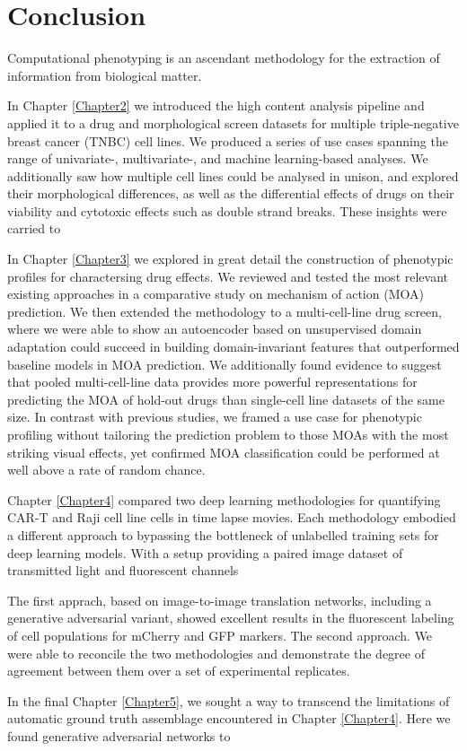 
\chapter{Conclusion} %

\label{Chapter6} %

Computational phenotyping is an ascendant methodology for the extraction of information from biological matter.

In Chapter \ref{Chapter2} we introduced the high content analysis pipeline and applied it to a drug and morphological screen datasets for multiple triple-negative breast cancer (TNBC) cell lines. We produced a series of use cases spanning the range of univariate-, multivariate-, and machine learning-based analyses. We additionally saw how multiple cell lines could be analysed in unison, and explored their morphological differences, as well as the differential effects of drugs on their viability and cytotoxic effects such as double strand breaks. These insights were carried to 

In Chapter \ref{Chapter3} we explored in great detail the construction of phenotypic profiles for charactersing drug effects. We reviewed and tested the most relevant existing approaches in a comparative study on mechanism of action (MOA) prediction. We then extended the methodology to a multi-cell-line drug screen, where we were able to show an autoencoder based on unsupervised domain adaptation could succeed in building domain-invariant features that outperformed baseline models in MOA prediction. We additionally found evidence to suggest that pooled multi-cell-line data provides more powerful representations for predicting the MOA of hold-out drugs than single-cell line datasets of the same size. In contrast with previous studies, we framed a use case for phenotypic profiling without tailoring the prediction problem to those MOAs with the most striking visual effects, yet confirmed MOA classification could be performed at well above a rate of random chance.

Chapter \ref{Chapter4} compared two deep learning methodologies for quantifying CAR-T and Raji cell line cells in time lapse movies. Each methodology embodied a different approach to bypassing the bottleneck of unlabelled training sets for deep learning models. With a setup providing a paired image dataset of transmitted light and fluorescent channels

The first apprach, based on image-to-image translation networks, including a generative adversarial variant, showed excellent results in the fluorescent labeling of cell populations for mCherry and GFP markers. The second approach. We were able to reconcile the two methodologies and demonstrate the degree of agreement between them over a set of experimental replicates.

In the final Chapter \ref{Chapter5}, we sought a way to transcend the limitations of automatic ground truth assemblage encountered in Chapter \ref{Chapter4}. Here we found generative adversarial networks to 